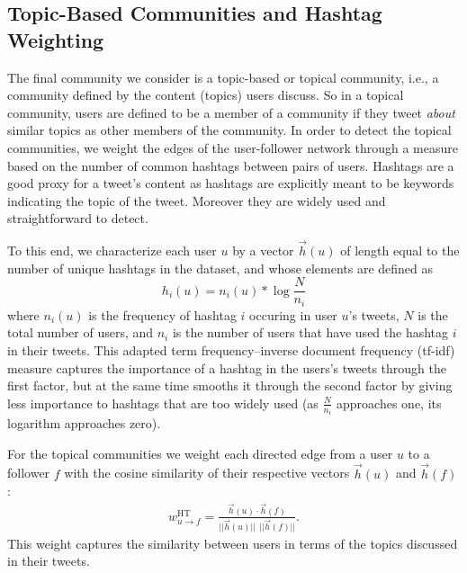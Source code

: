\subsection{Topic-Based Communities and Hashtag Weighting}
\label{sec:method-topic}

The final community we consider is a topic-based or topical community, i.e., a community defined by the content (topics) users discuss. So in a topical community, users are defined to be a member of a community if they tweet \emph{about} similar topics as other members of the community. 
In order to detect the topical communities, we weight the edges of the user-follower network through a measure based on the number of common hashtags between pairs of users. Hashtags are a good proxy for a tweet's content as hashtags are explicitly meant to be keywords indicating the topic of the tweet. Moreover they are widely used and straightforward to detect. 

To this end, we characterize each user $u$ by a vector $\vec{h}(u)$ of length equal to the number of unique hashtags in the dataset, and whose elements are defined as
\begin{equation}
h_i(u) = n_i(u) * \log{ \frac{N}{n_i} }
\end{equation}
where $n_i(u)$ is the frequency of hashtag $i$ occuring in user $u$'s tweets, $N$ is the total number of users, and $n_i$ is the number of users that have used the hashtag $i$ in their tweets. This adapted term frequency--inverse document frequency (tf-idf) measure \cite{salton_introduction_1983} captures the importance of a hashtag in the users's tweets through the first factor, but at the same time smooths it through the second factor by giving less importance to hashtags that are too widely used (as $\frac{N}{n_i}$ approaches one, its logarithm approaches zero). 

For the topical communities we weight each directed edge from a user $u$ to a follower $f$ with the cosine similarity of their respective vectors $\vec{h}(u)$ and $\vec{h}(f)$:
\begin{align}
	\label{Eqn-EW-topic}
	w_{u \to f}^{\text{HT}} = \frac{\vec{h}(u) \cdot \vec{h}(f)}{||\vec{h}(u)|| \ \ ||\vec{h}(f)||}.
\end{align}
This weight captures the similarity between users in terms of the topics discussed in their tweets. 
